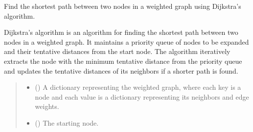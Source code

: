 \documentclass[letterpaper,10pt,english]{sphinxmanual}
\begin{document}
\begin{fulllineitems}
\label{\detokenize{documentation:loanpy.scapplier.dijkstra}}
\pysigstartsignatures
{}
\pysigstopsignatures
\sphinxAtStartPar
Find the shortest path between two nodes in a weighted graph
using Dijkstra’s algorithm.

\sphinxAtStartPar
Dijkstra’s algorithm is an algorithm for finding the shortest path
between two nodes in a weighted graph. It
maintains a priority queue of nodes to be expanded and their tentative
distances from the start node. The
algorithm iteratively extracts the node with the minimum tentative
distance from the priority queue and updates
the tentative distances of its neighbors if a shorter path is found.
\begin{quote}\begin{description}
\begin{itemize}
\item {} 
\sphinxAtStartPar
{} () \textendash{} A dictionary representing the weighted graph, where each
key is a node and each value is a
dictionary representing its neighbors and edge weights.

\item {} 
\sphinxAtStartPar
{} () \textendash{} The starting node.


\end{itemize}
\end{description}
\end{quote}
\end{fulllineitems}
\end{document}
